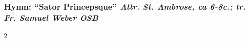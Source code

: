 \subsubsection*{Hymn: ``Sator Princepsque'' \hfill
{\small\itshape Attr. St. Ambrose, ca 6-8c.; tr. Fr. Samuel Weber OSB}}

\begin{multicols*}{2}
    
\end{multicols*}
